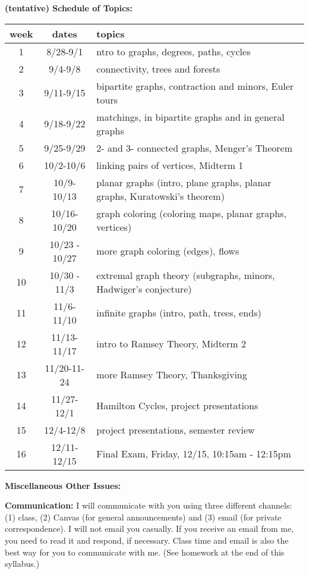 \documentclass[12pt]{article}
\begin{document}
\textbf{{(tentative) Schedule of Topics:}}

\begin{center}
\begin{tabular}{c | c || p{}}
week & dates &topics \\
\hline \hline
1& 8/28-9/1&ntro to graphs, degrees, paths, cycles\\ \hline
2& 9/4-9/8& connectivity, trees and forests\\ \hline
3& 9/11-9/15 & bipartite graphs, contraction and minors, Euler tours\\ \hline
4& 9/18-9/22& matchings, in bipartite graphs and in general graphs\\ \hline
5& 9/25-9/29& 2- and 3- connected graphs, Menger's Theorem\\ \hline
6& 10/2-10/6& linking pairs of vertices, Midterm 1\\ \hline
7& 10/9-10/13& planar graphs (intro, plane graphs, planar graphs, Kuratowski's theorem)\\ \hline
8& 10/16-10/20& graph coloring (coloring maps, planar graphs, vertices)\\ \hline
9& 10/23 - 10/27 &more graph coloring (edges), flows\\ \hline
10& 10/30 - 11/3& extremal graph theory (subgraphs, minors, Hadwiger's conjecture) \\ \hline
11& 11/6-11/10& infinite graphs (intro, path, trees, ends)\\ \hline
12& 11/13-11/17& intro to Ramsey Theory, Midterm 2\\ \hline
13& 11/20-11-24& more Ramsey Theory, Thanksgiving\\ \hline
14& 11/27-12/1&Hamilton Cycles, project presentations\\ \hline
15& 12/4-12/8& project presentations, semester review\\ \hline
16& 12/11-12/15& Final Exam, Friday, 12/15, 10:15am - 12:15pm\\ 
\end{tabular}
\end{center}


\textbf{Miscellaneous Other Issues:}

\textbf{Communication:} I will communicate with you using three different channels: (1) class, (2) Canvas (for general announcements) and (3) email (for private correspondence). I will not email you casually. If you receive an email from me, you need to read it and respond, if necessary.  Class time and email is also the best way for you to communicate with me. (See homework at the end of this syllabus.)
\end{document}
